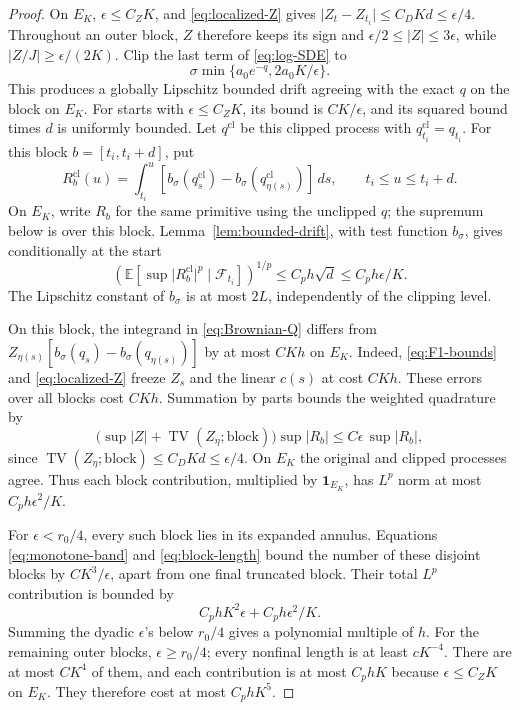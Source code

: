 \documentclass[11pt]{article}
\theoremstyle{remark}
\newcommand{\E}{\mathbb E}
\newcommand{\F}{\mathcal F}
\newcommand{\abs}[1]{\lvert#1\rvert}
\newcommand{\ind}{\mathbf 1}
\DeclareMathOperator{\TV}{TV}
\begin{document}
\begin{proof}
On \(E_K\), \(\epsilon\le C_ZK\), and \eqref{eq:localized-Z} gives
\(\abs{Z_t-Z_{t_i}}\le C_DKd\le\epsilon/4\).
Throughout an outer block, \(Z\) therefore keeps its sign and
\(\epsilon/2\le\abs Z\le3\epsilon\), while
\(\abs{Z/J}\ge\epsilon/(2K)\).
Clip the last term of \eqref{eq:log-SDE} to
\[
 \sigma\min\{a_0e^{-q},2a_0K/\epsilon\}.
\]
This produces a globally Lipschitz bounded drift agreeing with the
exact \(q\) on the block on \(E_K\).
For starts with \(\epsilon\le C_ZK\), its bound is \(CK/\epsilon\),
and its squared bound times \(d\) is uniformly bounded.
Let \(q^{\mathrm{cl}}\) be this clipped process with
\(q^{\mathrm{cl}}_{t_i}=q_{t_i}\). For this block \(b=[t_i,t_i+d]\), put
\[
 R_b^{\mathrm{cl}}(u)
   =\int_{t_i}^u
       [b_\sigma(q^{\mathrm{cl}}_s)
        -b_\sigma(q^{\mathrm{cl}}_{\eta(s)})]\,ds,
 \qquad t_i\le u\le t_i+d .
\]
On \(E_K\), write \(R_b\) for the same primitive using the unclipped \(q\);
the supremum below is over this block. Lemma~\ref{lem:bounded-drift},
with test function \(b_\sigma\), gives conditionally at the start
\begin{equation}\label{eq:clipped-R}
 \left(\E\left[\sup\abs{R_b^{\mathrm{cl}}}^p
                    \mid\F_{t_i}\right]\right)^{1/p}
 \le C_ph\sqrt d\le C_ph\epsilon/K .
\end{equation}
The Lipschitz constant of \(b_\sigma\) is at most \(2L\), independently
of the clipping level.

On this block, the integrand in \eqref{eq:Brownian-Q} differs from
\(Z_{\eta(s)}[b_\sigma(q_s)-b_\sigma(q_{\eta(s)})]\) by at most
\(CKh\) on \(E_K\). Indeed, \eqref{eq:F1-bounds} and
\eqref{eq:localized-Z} freeze \(Z_s\) and the linear \(c(s)\)
at cost \(CKh\). These errors over all blocks cost \(CKh\).
Summation by parts bounds the weighted quadrature by
\[
 \bigl(\sup\abs Z+\TV(Z_\eta;\text{block})\bigr)\sup\abs{R_b}
 \le C\epsilon\,\sup\abs{R_b},
\]
since \(\TV(Z_\eta;\text{block})\le C_DKd\le\epsilon/4\).
On \(E_K\) the original and clipped processes agree.
Thus each block contribution, multiplied by \(\ind_{E_K}\),
has \(L^p\) norm at most \(C_ph\epsilon^2/K\).


For \(\epsilon<r_0/4\), every such block lies in its expanded annulus.
Equations \eqref{eq:monotone-band} and \eqref{eq:block-length}
bound the number of these disjoint blocks by \(CK^3/\epsilon\),
apart from one final truncated block.
Their total \(L^p\) contribution is bounded by
\[
 C_phK^2\epsilon+C_ph\epsilon^2/K .
\]
Summing the dyadic \(\epsilon\)'s below \(r_0/4\) gives a polynomial
multiple of \(h\). For the remaining outer blocks,
\(\epsilon\ge r_0/4\); every nonfinal length is at least \(cK^{-4}\).
There are at most \(CK^4\) of them, and each contribution is at most
\(C_phK\) because \(\epsilon\le C_ZK\) on \(E_K\).
They therefore cost at most \(C_phK^5\).


\end{proof}
\end{document}
